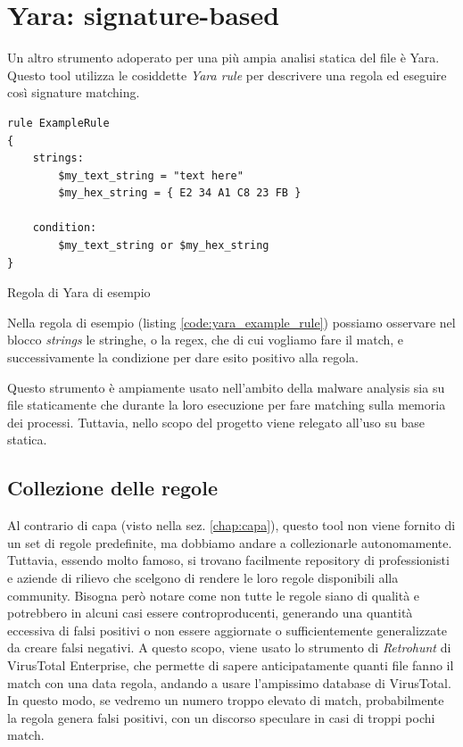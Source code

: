 \section{Yara: signature-based}
Un altro strumento adoperato per una più ampia analisi statica del file è Yara.
Questo tool utilizza le cosiddette \emph{Yara rule} per descrivere una regola ed eseguire così signature matching.

\begin{code}
    \begin{verbatim}
rule ExampleRule
{
    strings:
        $my_text_string = "text here"
        $my_hex_string = { E2 34 A1 C8 23 FB }

    condition:
        $my_text_string or $my_hex_string
}
    \end{verbatim}
    \caption{Regola di Yara di esempio}
    \label{code:yara_example_rule}
\end{code}

Nella regola di esempio (listing \ref{code:yara_example_rule}) possiamo osservare nel blocco \emph{strings} le stringhe, o la regex, che di cui vogliamo fare il match, e successivamente la condizione per dare esito positivo alla regola.

Questo strumento è ampiamente usato nell'ambito della malware analysis sia su file staticamente che durante la loro esecuzione per fare matching sulla memoria dei processi. Tuttavia, nello scopo del progetto viene relegato all'uso su base statica.

\subsection{Collezione delle regole}
Al contrario di capa (visto nella sez. \ref{chap:capa}), questo tool non viene fornito di un set di regole predefinite, ma dobbiamo andare a collezionarle autonomamente.
Tuttavia, essendo molto famoso, si trovano facilmente repository di professionisti e aziende di rilievo che scelgono di rendere le loro regole disponibili alla community. Bisogna però notare come non tutte le regole siano di qualità e potrebbero in alcuni casi essere controproducenti, generando una quantità eccessiva di falsi positivi o non essere aggiornate o sufficientemente generalizzate da creare falsi negativi.
A questo scopo, viene usato lo strumento di \emph{Retrohunt} di VirusTotal Enterprise, che permette di sapere anticipatamente quanti file fanno il match con una data regola, andando a usare l'ampissimo database di VirusTotal. In questo modo, se vedremo un numero troppo elevato di match, probabilmente la regola genera falsi positivi, con un discorso speculare in casi di troppi pochi match.


